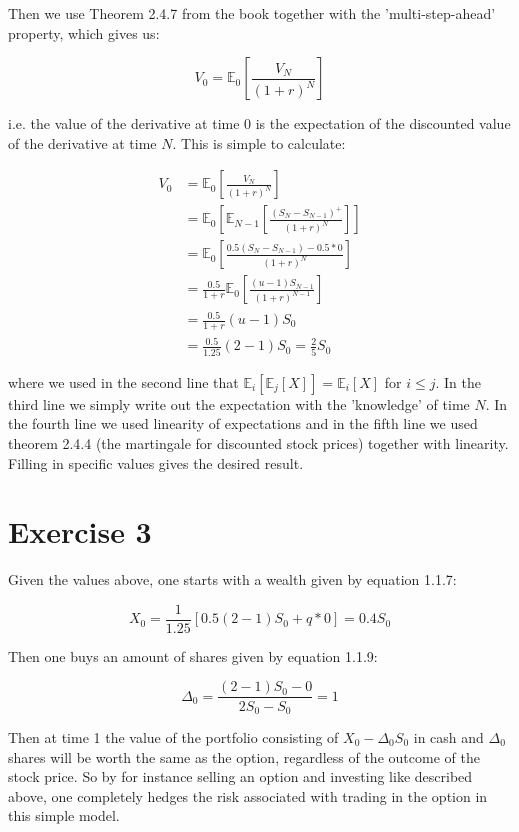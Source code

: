 \documentclass[11pt,a4paper,onecolumn]{article}
\begin{document}
Then we use Theorem 2.4.7 from the book together with the 'multi-step-ahead' property, which gives us:

\begin{equation}
  V_0 = \mathbb{E}_0\left[\frac{V_{N}}{(1+r)^N}\right] 
\end{equation}

i.e. the value of the derivative at time 0 is the expectation of the discounted value of the derivative at time $N$. This is simple to calculate:

\begin{align}
  V_0 &= \mathbb{E}_0\left[\frac{V_{N}}{(1+r)^N}\right] \\
  &= \mathbb{E}_0\left[\mathbb{E}_{N-1}\left[\frac{(S_{N} - S_{N-1})^+}{(1+r)^N}\right]\right] \\
  &= \mathbb{E}_0\left[\frac{0.5 (S_{N} - S_{N-1}) - 0.5 * 0}{(1 + r)^N}\right] \\
  &= \frac{0.5}{1+r} \mathbb{E}_0\left[\frac{(u - 1)S_{N-1}}{(1+r)^{N-1}}\right] \\
  &= \frac{0.5}{1+r} (u - 1)S_0 \\
  &= \frac{0.5}{1.25} (2 - 1)S_0 = \frac{2}{5}S_0
\end{align}

where we used in the second line that $\mathbb{E}_i[\mathbb{E}_j[X]] = \mathbb{E}_i[X]$ for $i \leq j$. In the third line we simply write out the expectation with the 'knowledge' of time $N$. In the fourth line we used linearity of expectations and in the fifth line we used theorem 2.4.4 (the martingale for discounted stock prices) together with linearity. Filling in specific values gives the desired result.

\section{Exercise 3}
Given the values above, one starts with a wealth given by equation 1.1.7:

\begin{equation}
  X_0 = \frac{1}{1.25}[0.5 (2 - 1)S_0 + q * 0] = 0.4S_0
\end{equation}

Then one buys an amount of shares given by equation 1.1.9:

\begin{equation}
  \Delta_0 = \frac{(2 - 1)S_0 - 0}{2S_0 - S_0} = 1 
\end{equation}

Then at time 1 the value of the portfolio consisting of $X_0 - \Delta_0 S_0$ in cash and $\Delta_0$ shares will be worth the same as the option, regardless of the outcome of the stock price. So by for instance selling an option and investing like described above, one completely hedges the risk associated with trading in the option in this simple model.
\end{document}
